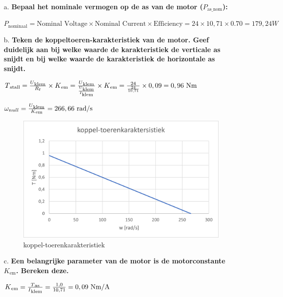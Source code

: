 \begin{enumerate}
    \item [a.] \textbf{Bepaal het nominale vermogen op de as van de motor ($P_{\text{as\_nom}}$):}
    
        $P_{\text{nominaal}} = \text{Nominal Voltage} \times \text{Nominal Current} \times \text{Efficiency} = 24 \times 10,71 \times 0.70 = 179,24W$



    \item [b.] \textbf{Teken de koppeltoeren-karakteristiek van de motor. Geef duidelijk aan bij
    welke waarde de karakteristiek de verticale as snijdt en bij welke waarde de
    karakteristiek de horizontale as snijdt.}

        $T\textsubscript{stall} = \frac{U\textsubscript{klem}}{R\textsubscript{r}} \times K\textsubscript{em} = \frac{U\textsubscript{klem}}{\frac{U\textsubscript{klem}}{I\textsubscript{klem}}} \times K\textsubscript{em} = \frac{24}{\frac{24}{10,71}} \times 0,09 = 0,96 \text{ Nm}$

        $\omega_{null} = \frac{U\textsubscript{klem}}{K\textsubscript{em}} = 266,66 \text{ rad/s}$

        \begin{figure}[h]
            \centering
            \includegraphics[scale=0.7]{koppel-toerenkarakteristiek 1b.png}
            \caption{koppel-toerenkarakteristiek}
        \end{figure}

    \item [c.] \textbf{Een belangrijke parameter van de motor is de motorconstante $K_{\text{em}}$.
    Bereken deze.}

        $K\textsubscript{em} = \frac{T\textsubscript{as}}{I\textsubscript{klem}} = \frac{1,0}{10,71} = 0,09 \text{ Nm/A}$


\end{enumerate}
